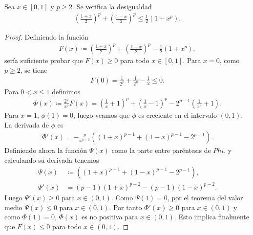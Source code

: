 \begin{lemma} \label{lema:clarkson-1}
    Sea $ x \in [0, 1] $ y $ p \geq 2 $. Se verifica la desigualdad
    \begin{align}
        \left( \frac{1+x}{2} \right)^p + \left( \frac{1-x}{2} \right)^p \leq \frac{1}{2} (1 + x^p).
    \end{align}
\end{lemma}
\begin{proof}
    Definiendo la función
    \begin{align}
        F(x) \coloneq \left( \frac{1+x}{2} \right)^p + \left( \frac{1-x}{2} \right)^p - \frac{1}{2} (1 + x^p),
    \end{align}
    sería suficiente probar que $ F(x) \geq 0 $ para todo $ x \in [0, 1] $. Para $ x = 0 $, como $ p \geq 2 $, se tiene 
    \begin{align}
        F(0) = \frac{1}{2^p} + \frac{1}{2^p} - \frac{1}{2} \leq 0.
    \end{align}
    Para $ 0 < x \leq 1 $ definimos
    \begin{align}
        \Phi(x) \coloneq \frac{2^p}{x^p} F(x) = \left( \frac{1}{x} + 1 \right)^p + \left( \frac{1}{x} - 1 \right)^p - 2^{p-1} \left( \frac{1}{x^p} + 1 \right).
    \end{align}
    Para $ x = 1 $, $ \phi(1) = 0 $, luego veamos que $ \phi $ es creciente en el intervalo $ (0, 1) $. La derivada de $ \phi $ es
    \begin{align}
        \Phi'(x) = -\frac{p}{x^{p+1}} \left( (1+x)^{p-1} + (1-x)^{p-1} - 2^{p-1} \right).
    \end{align}
    Definiendo ahora la función $ \Psi(x) $ como la parte entre paréntesis de $ Phi$, y calculando su derivada tenemos
    \begin{align}
        \Psi(x) &\coloneq \left( (1+x)^{p-1} + (1-x)^{p-1} - 2^{p-1} \right), \\
        \Psi'(x) &= (p-1)(1+x)^{p-2} - (p-1)(1-x)^{p-2}.
    \end{align}
    Luego $ \Psi'(x) \geq 0 $ para $ x \in (0, 1) $. Como $ \Psi(1) = 0 $, por el teorema del valor medio $ \Psi(x) \leq 0 $ para $ x \in (0, 1) $. Por tanto $ \Phi'(x) \geq 0 $ para $ x \in (0, 1) $ y como $ \Phi(1) = 0 $, $ \Phi(x) $ es no positiva para $ x \in (0, 1) $. Esto implica finalmente que $ F(x) \leq 0 $ para todo $ x \in (0, 1) $.
\end{proof}

